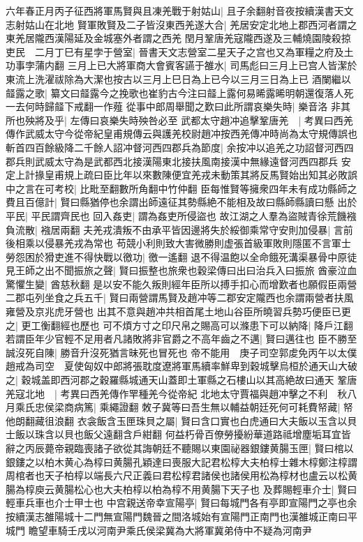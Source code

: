 六年春正月丙子征西將軍馬賢與且凍羌戰于射姑山|{
	且子余翻射音夜按續漢書天文志射姑山在北地}
賢軍敗賢及二子皆沒東西羌遂大合|{
	羌居安定北地上郡西河者謂之東羌居隴西漢陽延及金城塞外者謂之西羌}
閏月鞏唐羌寇隴西遂及三輔燒園陵殺掠吏民　二月丁巳有星孛于營室|{
	晉書天文志營室二星天子之宫也又為軍糧之府及土功事孛蒲内翻}
三月上已大將軍商大會賓客讌于雒水|{
	司馬彪曰三月上已宫人皆潔於東流上洗濯祓除為大潔也按古以三月上巳日為上已今以三月三日為上已}
酒闌繼以䪥露之歌|{
	纂文曰䪥露今之挽歌也崔豹古今注曰䪥上露何易晞露晞明朝還復落人死一去何時歸䪥下戒翻一作薤}
從事中郎周舉聞之歎曰此所謂哀樂失時|{
	樂音洛}
非其所也殃將及乎|{
	左傳曰哀樂失時殃咎必至}
武都太守趙冲追擊鞏唐羌　|{
	考異曰西羌傳作武威太守今從帝紀皇甫規傳云與護羌校尉趙冲按西羌傳冲時尚為太守規傳誤也}
斬首四百餘級降二千餘人詔冲督河西四郡兵為節度|{
	余按冲以追羌之功詔督河西四郡兵則武威太守為是武都西北接漢陽東北接扶風南接漢中無緣遠督河西四郡兵}
安定上計掾皇甫規上疏曰臣比年以來數陳便宜羌戎未動策其將反馬賢始出知其必敗誤中之言在可考校|{
	比毗至翻數所角翻中竹仲翻}
臣每惟賢等擁衆四年未有成功縣師之費且百億計|{
	賢曰縣猶停也余謂出師遠征其勢縣絶不能相及故曰縣師縣讀曰懸}
出於平民|{
	平民謂齊民也}
回入姦吏|{
	謂為姦吏所侵盜也}
故江湖之人羣為盜賊青徐荒饑襁負流散|{
	襁居兩翻}
夫羌戎潰叛不由承平皆因邊將失於綏御乘常守安則加侵暴|{
	言前後相乘以侵暴羌戎為常也}
苟競小利則致大害微勝則虚張首級軍敗則隱匿不言軍士勞怨困於猾吏進不得快戰以徼功|{
	徼一遙翻}
退不得温飽以全命餓死溝渠暴骨中原徒見王師之出不聞振旅之聲|{
	賢曰振整也旅衆也穀梁傳曰出曰治兵入曰振旅}
酋豪泣血驚懼生變|{
	酋慈秋翻}
是以安不能久叛則經年臣所以搏手扣心而增歎者也願假臣兩營二郡屯列坐食之兵五千|{
	賢曰兩營謂馬賢及趙冲等二郡安定隴西也余謂兩營者扶風雍營及京兆虎牙營也}
出其不意與趙冲共相首尾土地山谷臣所曉習兵勢巧便臣已更之|{
	更工衡翻經也歷也}
可不煩方寸之印尺帛之賜高可以滌患下可以納降|{
	降戶江翻}
若謂臣年少官輕不足用者凡諸敗將非官爵之不高年齒之不邁|{
	賢曰邁往也}
臣不勝至誠沒死自陳|{
	勝音升沒死猶言昧死也冒死也}
帝不能用　庚子司空郭䖍免丙午以太僕趙戒為司空　夏使匈奴中郎將張耽度遼將軍馬續率鮮卑到穀城擊烏桓於通天山大破之|{
	穀城盖即西河郡之穀羅縣城通天山蓋即土軍縣之石樓山以其高絶故曰通天}
鞏唐羌寇北地　|{
	考異曰西羌傳作䍐種羌今從帝紀}
北地太守賈福與趙冲擊之不利　秋八月乘氏忠侯梁商病篤|{
	乘繩證翻}
敇子冀等曰吾生無以輔益朝廷死何可耗費帑藏|{
	帑他朗翻藏徂浪翻}
衣衾飯含玉匣珠貝之屬|{
	賢曰含口實也白虎通曰大夫飯以玉含以貝士飯以珠含以貝也飯父遠翻含戶紺翻}
何益朽骨百僚勞擾紛華道路祗增塵垢耳宜皆辭之丙辰薨帝親臨喪諸子欲從其誨朝廷不聽賜以東園祕器銀鏤黄腸玉匣|{
	賢曰棺以銀鏤之以柏木黄心為椁曰黄腸孔穎達曰喪服大記君松椁大夫柏椁士雜木椁鄭注椁謂周棺者也天子柏椁以端長六尺正義曰君松椁君諸侯也諸侯用松為椁材也盧云以松黄腸為椁庾云黄腸松心也大夫柏椁以柏為椁不用黄腸下天子也}
及葬賜輕車介士|{
	賢曰輕車兵車也介士甲士也}
中宫親送帝幸宣陽亭|{
	賢曰每城門各有亭即宣陽門之亭也余按續漢志雒陽城十二門無宣陽門魏晉之間洛城始有宣陽門正南門也漢雒城正南曰平城門}
瞻望車騎壬戌以河南尹乘氏侯梁冀為大將軍冀弟侍中不疑為河南尹

